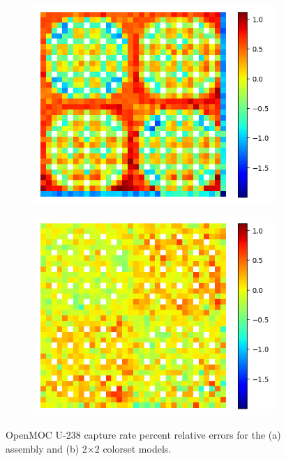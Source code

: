 \begin{figure}[h!]
\begin{subfigure}{0.45\textwidth}
  \centering
  \includegraphics[width=\linewidth]{figures/reflector/capt-null-errors}
  \caption{}
  \label{fig:reflector-capt-null-error}
\end{subfigure}%
\begin{subfigure}{0.45\textwidth}
  \centering
  \includegraphics[width=\linewidth]{figures/reflector/capt-degenerate-errors}
  \caption{}
  \label{fig:reflector-capt-degen-error}
\end{subfigure}
\caption{OpenMOC U-238 capture rate percent relative errors for the (a) assembly and (b) 2$\times$2 colorset models.}
\label{fig:capt-errors}
\end{figure}

